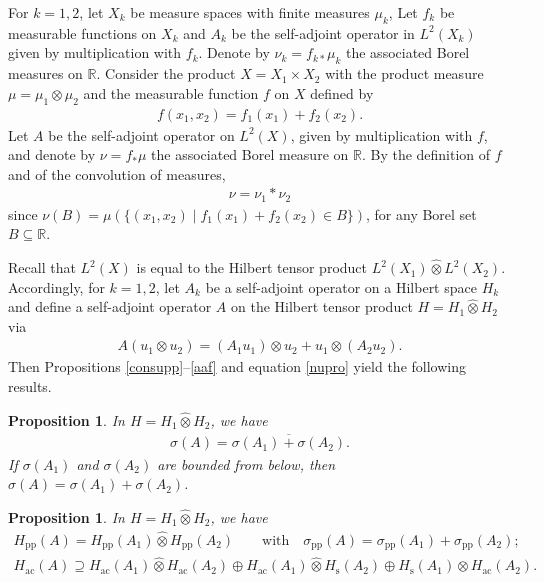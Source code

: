 \documentclass[pdftex]{sigma}
\numberwithin{equation}{section}
\newtheorem{Proposition}[Theorem]{Proposition}
\def\p{\mathrm{pp}}
\def\ac{\mathrm{ac}}
\def\s{\mathrm s}
\def\R{\mathbb R}
\begin{document}
For $k=1,2$, let $X_k$ be measure spaces with finite measures $\mu_k$,
Let $f_k$ be measurable functions on $X_k$ and $A_k$ be the self-adjoint operator in $L^2(X_k)$
given by multiplication with $f_k$.
Denote by $\nu_k=f_{k*}\mu_k$ the associated Borel measures on $\R$.
Consider the product $X=X_1\times X_2$ with the product measure $\mu=\mu_1\otimes\mu_2$
and the measurable function $f$ on $X$ defined by
\begin{align*}
 f(x_1,x_2) = f_1(x_1) + f_2(x_2).
\end{align*}
Let $A$ be the self-adjoint operator on $L^2(X)$, given by multiplication with $f$,
and denote by $\nu=f_*\mu$ the associated Borel measure on $\R$.
By the definition of $f$ and of the convolution of measures,
\begin{align}\label{nupro}
	\nu = \nu_1*\nu_2
\end{align}
since $\nu(B)=\mu(\{(x_1,x_2)\mid f_1(x_1)+f_2(x_2)\in B\})$, for any Borel set $B\subseteq\R$.

Recall that $L^2(X)$ is equal to the Hilbert tensor product $L^2(X_1)\hat\otimes L^2(X_2)$.
Accordingly, for $k=1,2$, let $A_k$ be a self-adjoint operator on a Hilbert space $H_k$
and define a self-adjoint operator $A$ on the Hilbert tensor product $H=H_1\hat\otimes H_2$ via
\begin{align*}%
	A(u_1\otimes u_2) = (A_1u_1)\otimes u_2 + u_1\otimes(A_2u_2).
\end{align*}
Then Propositions \ref{consupp}--\ref{aaf} and equation \eqref{nupro}
yield the following results.

\begin{Proposition}\label{suma}
In $H=H_1\hat\otimes H_2$, we have
\begin{align*}
	\sigma(A) = \overline{\sigma(A_1)+\sigma(A_2)}.
\end{align*}
If $\sigma(A_1)$ and $\sigma(A_2)$ are bounded from below,
then $\sigma(A)=\sigma(A_1)+\sigma(A_2)$.
\end{Proposition}

\begin{Proposition}%
In $H=H_1\hat\otimes H_2$, we have
\begin{gather*}
	H_{\p}(A) = H_{\p}(A_1) \hat\otimes H_{\p}(A_2) \qquad\text{with}\quad
	\sigma_{\p}(A) = \sigma_{\p}(A_1) + \sigma_{\p}(A_2); \\
	H_{\ac}(A) \supseteq
	H_{\ac}(A_1) \hat\otimes H_{\ac}(A_2) \oplus H_{\ac}(A_1) \hat\otimes H_{\s}(A_2)
	\oplus H_{\s}(A_1) \hat\otimes H_{\ac}(A_2).
\end{gather*}
\end{Proposition}
\end{document}

